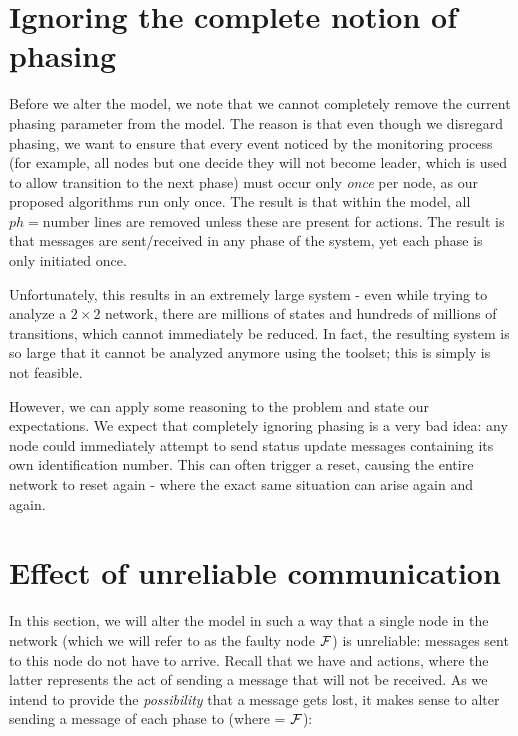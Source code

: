 \section{Ignoring the complete notion of phasing}
\label{sec:ignorephase}

Before we alter the model, we note that we cannot completely remove the current phasing parameter from the model. The reason is that even though we disregard phasing, we want to ensure that every event noticed by the monitoring process (for example, all nodes but one decide they will not become leader, which is used to allow transition to the next phase) must occur only \emph{once} per node, as our proposed algorithms run only once. The result is that within the model, all $ph = \mbox{number}$ lines are removed unless these are present for  actions. The result is that messages are sent/received in any phase of the system, yet each phase is only initiated once.

Unfortunately, this results in an extremely large system - even while trying to analyze a $2 \times 2$ network, there are millions of states and hundreds of millions of transitions, which cannot immediately be reduced. In fact, the resulting system is so large that it cannot be analyzed anymore using the toolset; this is simply is not feasible.

However, we can apply some reasoning to the problem and state our expectations. We expect that completely ignoring phasing is a very bad idea: any node could immediately attempt to send status update messages containing its own identification number. This can often trigger a reset, causing the entire network to reset again - where the exact same situation can arise again and again.

\section{Effect of unreliable communication}
\label{sec:unreliablecomm}

In this section, we will alter the model in such a way that a single node in the network (which we will refer to as the faulty node $\mathcal{F}$) is unreliable: messages sent to this node do not have to arrive. Recall that we have  and  actions, where the latter represents the act of sending a message that will not be received. As we intend to provide the \emph{possibility} that a message gets lost, it makes sense to alter sending a message of each phase to (where  = $\mathcal{F}$):

